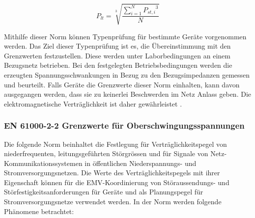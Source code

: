 \begin{appendix}
\begin{equation}\label{eq:Plt}
P_{lt} = {\sqrt[3]{\frac{\sum_{i=1}^{N} {P_{st,i}}^3}{N}}}
\end{equation}

Mithilfe dieser Norm können Typenprüfung für bestimmte Geräte vorgenommen werden. Das Ziel dieser Typenprüfung ist es, die Übereinstimmung mit den Grenzwerten festzustellen. Diese werden unter Laborbedingungen an einem Bezugsnetz betrieben. Bei den festgelegten Betriebsbedingungen werden die erzeugten Spannungsschwankungen in Bezug zu den Bezugsimpedanzen gemessen und beurteilt. Falls Geräte die Grenzwerte dieser Norm einhalten, kann davon ausgegangen werden, dass sie zu keinerlei Beschwerden im Netz Anlass geben. Die elektromagnetische Verträglichkeit ist daher gewährleistet \cite{FlickerNorm}. 


\subsubsection{EN 61000-2-2 Grenzwerte für Oberschwingungsspannungen}

Die folgende Norm beinhaltet die Festlegung für Verträglichkeitspegel von niederfrequenten, leitungsgeführten Störgrössen und für Signale von Netz-Kommunikationssystemen in öffentlichen Niederspannungs- und Stromversorgungsnetzen. Die Werte des Verträglichkeitspegels mit ihrer Eigenschaft können für die EMV-Koordinierung von Störaussendungs- und Störfestigkeitsanforderungen für Geräte und als Planungspegel für Stromversorgungsnetze verwendet werden. In der Norm werden folgende Phänomene betrachtet:


\end{appendix}
